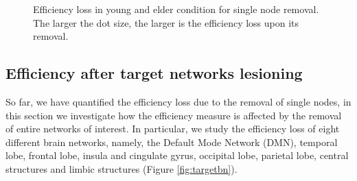 \documentclass[12pt,a4paper]{article}
\begin{document}
\begin{figure}[H]
    \hfill
    \caption{Efficiency loss in young and elder condition for single node removal. The larger the dot size, the larger is the efficiency loss upon its removal.} 
    \label{fig:effloss}
  \end{figure} 


\subsection{Efficiency after target networks lesioning}
\label{ss:target}
So far, we have quantified the efficiency loss due to the removal of single nodes, in this section we investigate how the efficiency measure is affected by the removal of entire networks of interest. In particular, we study the efficiency loss of eight different brain networks, namely, the Default Mode Network (DMN), temporal lobe, frontal lobe, insula and cingulate gyrus, occipital lobe, parietal lobe, central structures and limbic structures (Figure \ref{fig:targetbn}).
 
\end{document}
